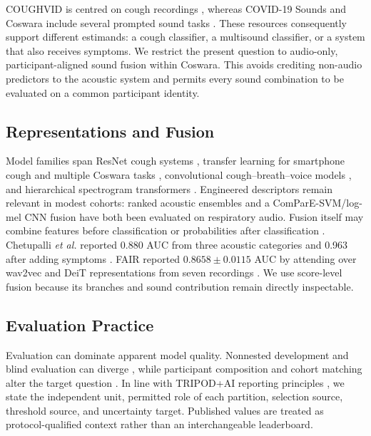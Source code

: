 \documentclass[conference]{IEEEtran}
\begin{document}
COUGHVID is centred on cough recordings \cite{orlandic2021coughvid}, whereas
COVID-19 Sounds and Coswara include several prompted sound tasks
\cite{xia2021covid,bhattacharya2023coswara}. These resources consequently
support different estimands: a cough classifier, a multisound classifier, or a
system that also receives symptoms. We restrict the present question to
audio-only, participant-aligned sound fusion within Coswara. This avoids
crediting non-audio predictors to the acoustic system and permits every sound
combination to be evaluated on a common participant identity.

\subsection{Representations and Fusion}

Model families span ResNet cough systems \cite{laguarta2020cough}, transfer
learning for smartphone cough and multiple Coswara tasks
\cite{pahar2021smartphone,pahar2022transfer}, convolutional cough--breath--voice
models \cite{celik2023covidcoughnet}, and hierarchical spectrogram transformers
\cite{aytekin2024hst}. Engineered descriptors remain relevant in modest cohorts:
ranked acoustic ensembles \cite{chowdhury2022mcdm} and a ComParE-SVM/log-mel
CNN fusion \cite{avila2021feature} have both been evaluated on respiratory
audio. Fusion itself may combine features before classification or probabilities
after classification \cite{baltrusaitis2019survey}. Chetupalli \emph{et al.}
reported 0.880 AUC from three acoustic categories and 0.963 after adding
symptoms \cite{chetupalli2023multimodal}. FAIR reported
$0.8658\pm0.0115$ AUC by attending over wav2vec and DeiT representations from
seven recordings \cite{truong2024fair}. We use score-level fusion because its
branches and sound contribution remain directly inspectable.

\subsection{Evaluation Practice}

Evaluation can dominate apparent model quality. Nonnested development and blind
evaluation can diverge \cite{avila2021feature}, while participant composition
and cohort matching alter the target question
\cite{han2022realistic,coppock2024audio}. In line with TRIPOD+AI reporting
principles \cite{collins2024tripod}, we state the independent unit, permitted
role of each partition, selection source, threshold source, and uncertainty
target. Published values are treated as protocol-qualified context rather than
an interchangeable leaderboard.
\end{document}
